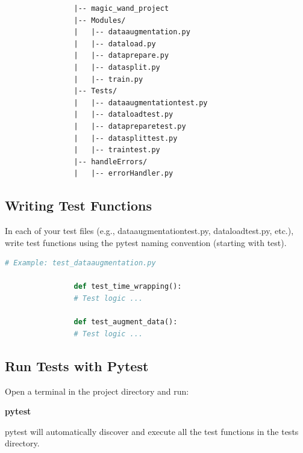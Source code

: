 			\begin{verbatim}
				|-- magic_wand_project
				|-- Modules/
				|   |-- dataaugmentation.py
				|   |-- dataload.py
				|   |-- dataprepare.py
				|   |-- datasplit.py
				|   |-- train.py
				|-- Tests/
				|   |-- dataaugmentationtest.py
				|   |-- dataloadtest.py
				|   |-- datapreparetest.py
				|   |-- datasplittest.py
				|   |-- traintest.py
				|-- handleErrors/
				|   |-- errorHandler.py
			\end{verbatim}
		
			\subsection{Writing Test Functions}
			
			In each of your test files (e.g., dataaugmentationtest.py, dataloadtest.py, etc.), write test functions using the pytest naming convention (starting with test).
		
			\begin{lstlisting}[language=Python, caption={Example of Test Functions for Data Augmentation}, label={code:test-dataaugmentation}, style=pythonstyle]
				# Example: test_dataaugmentation.py
				
				def test_time_wrapping():
				# Test logic ...
				
				def test_augment_data():
				# Test logic ...
			\end{lstlisting}
			
			\subsection{Run Tests with Pytest}
			
			Open a terminal in the project directory and run:
			
			\textbf{pytest}
			
			pytest will automatically discover and execute all the test functions in the tests directory.
			
